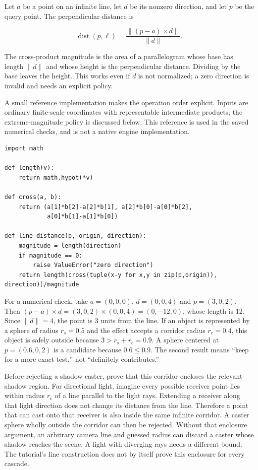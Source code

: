 Let \(a\) be a point on an infinite line, let \(d\) be its nonzero direction, and let \(p\) be the query point. The perpendicular distance is

\[
\operatorname{dist}(p,\ell)=\frac{\|(p-a)\times d\|}{\|d\|}.
\]

The cross-product magnitude is the area of a parallelogram whose base has length \(\|d\|\) and whose height is the perpendicular distance. Dividing by the base leaves the height. This works even if \(d\) is not normalized; a zero direction is invalid and needs an explicit policy.

A small reference implementation makes the operation order explicit. Inputs are ordinary finite-scale coordinates with representable intermediate products; the extreme-magnitude policy is discussed below. This reference is used in the saved numerical checks, and is not a native engine implementation.

\begin{verbatim}
import math

def length(v):
    return math.hypot(*v)

def cross(a, b):
    return (a[1]*b[2]-a[2]*b[1], a[2]*b[0]-a[0]*b[2],
            a[0]*b[1]-a[1]*b[0])

def line_distance(p, origin, direction):
    magnitude = length(direction)
    if magnitude == 0:
        raise ValueError("zero direction")
    return length(cross(tuple(x-y for x,y in zip(p,origin)), direction))/magnitude
\end{verbatim}

For a numerical check, take \(a=(0,0,0)\), \(d=(0,0,4)\) and \(p=(3,0,2)\). Then \((p-a)\times d=(3,0,2)\times(0,0,4)=(0,-12,0)\), whose length is 12. Since \(\|d\|=4\), the point is 3 units from the line. If an object is represented by a sphere of radius \(r_s=0.5\) and the effect accepts a corridor radius \(r_c=0.4\), this object is safely outside because \(3>r_s+r_c=0.9\). A sphere centered at \(p=(0.6,0,2)\) is a candidate because \(0.6\leq0.9\). The second result means ``keep for a more exact test,'' not ``definitely contributes.''

Before rejecting a shadow caster, prove that this corridor encloses the relevant shadow region. For directional light, imagine every possible receiver point lies within radius \(r_c\) of a line parallel to the light rays. Extending a receiver along that light direction does not change its distance from the line. Therefore a point that can cast onto that receiver is also inside the same infinite corridor. A caster sphere wholly outside the corridor can then be rejected. Without that enclosure argument, an arbitrary camera line and guessed radius can discard a caster whose shadow reaches the scene. A light with diverging rays needs a different bound. The tutorial's line construction does not by itself prove this enclosure for every cascade.


